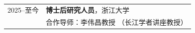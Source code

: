 \begin{longtable}{@{}p{}p{}@{}}
2025--至今 & \textbf{博士后研究人员}，浙江大学 \\
           & 合作导师：李伟昌教授 {\small\color{darkslategrey}（长江学者讲座教授）} \\
\end{longtable}

